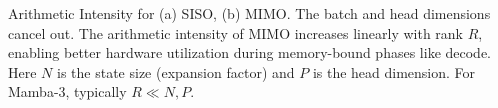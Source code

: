 \documentclass{article}
\theoremstyle{plain}
\theoremstyle{definition}
\theoremstyle{remark}
\begin{document}
\begin{table}[t]
  \centering

  \caption{
  Arithmetic Intensity for (a) SISO, (b) MIMO.
  The batch and head dimensions cancel out.
  The arithmetic intensity of MIMO increases linearly with rank $R$, enabling better hardware utilization during memory-bound phases like decode.
  Here $N$ is the state size (expansion factor) and $P$ is the head dimension. For Mamba-3, typically $R \ll N, P$.
  }

  \begin{subtable}[b]{0.48\linewidth}
    \small\centering
    \caption{SISO (2-byte data).}
    \label{tab:arith_intensity_siso}
  \end{subtable}\hfill
  \begin{subtable}[b]{0.48\linewidth}
    \small\centering
\end{subtable}
\end{table}
\end{document}
